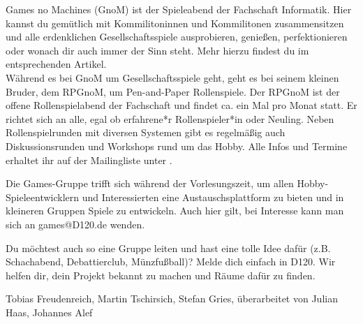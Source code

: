 {    Games no Machines (GnoM) ist der Spieleabend der Fachschaft Informatik. Hier kannst du gemütlich mit Kommilitoninnen und Kommilitonen zusammensitzen und alle erdenklichen Gesellschaftsspiele ausprobieren, genießen, perfektionieren oder wonach dir auch immer der Sinn steht. Mehr hierzu findest du im entsprechenden Artikel.\\
    Während es bei GnoM um Gesellschaftsspiele geht, geht es bei seinem kleinen Bruder, dem RPGnoM, um Pen-and-Paper Rollenspiele.
    Der RPGnoM ist der offene Rollenspielabend der Fachschaft und findet ca. ein Mal pro Monat statt. Er richtet sich an alle, egal ob erfahrene*r Rollenspieler*in oder Neuling. Neben Rollenspielrunden mit diversen Systemen gibt es regelmäßig auch Diskussionsrunden und Workshops rund um das Hobby. Alle Infos und Termine erhaltet ihr auf der Mailingliste unter \footnotemark[12].

    Die Games-Gruppe trifft sich während der Vorlesungszeit, um allen Hobby-Spieleentwicklern und Interessierten eine Austauschsplattform zu bieten und in kleineren Gruppen Spiele zu entwickeln. Auch hier gilt, bei Interesse kann man sich an \mbox{games@D120.de} wenden.

    Du möchtest auch so eine Gruppe leiten und hast eine tolle Idee dafür (z.B. Schachabend, Debattierclub, Münzfußball)? Melde dich einfach in D120. Wir helfen dir, dein Projekt bekannt zu machen und Räume dafür zu finden.
}
{Tobias Freudenreich, Martin Tschirsich, Stefan Gries,
    überarbeitet von Julian Haas, Johannes Alef}


\newpage
